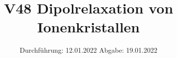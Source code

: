 

\subject{Fortgeschrittenenpraktikum}
\title{V48 Dipolrelaxation von Ionenkristallen}
\date{%
  Durchführung: 12.01.2022
  \hspace{3em}
  Abgabe: 19.01.2022
}



\maketitle
\thispagestyle{empty}
\tableofcontents
\newpage








\printbibliography{}




